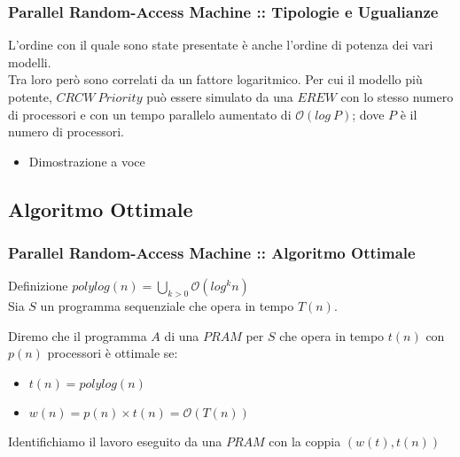 \documentclass{beamer}
\newcommand{\bigO}{\ensuremath{\mathcal{O}}} %
\begin{document}
\begin{frame}
	\frametitle{Parallel Random-Access Machine :: Tipologie e Ugualianze} %
	L'ordine con il quale sono state presentate è anche l'ordine di potenza dei vari modelli.\\
	Tra loro però sono correlati da un fattore logaritmico. Per cui il modello più potente, $CRCW\ Priority$ può essere simulato da una $EREW$ con lo stesso numero di processori e con un tempo parallelo aumentato di $\bigO{(log\ P)}$; dove $P$ è il numero di processori.
	\begin{itemize}
		\item Dimostrazione a voce
	\end{itemize}
\end{frame}

\subsection{Algoritmo Ottimale}

\begin{frame}
	\frametitle{Parallel Random-Access Machine :: Algoritmo Ottimale} %
	
	\begin{block}{Definizione}
	$polylog(n) = \bigcup_{k>0}\bigO{(log^k n)}$\\
	Sia $S$ un programma sequenziale che opera in tempo $T(n)$.\\
	\end{block}
	Diremo che il programma $A$ di una $PRAM$ per $S$ che opera in tempo $t(n)$ con $p(n)$ processori è ottimale se:
	\begin{itemize}
		\item $t(n) = polylog(n)$
		\item $w(n) = p(n)\times t(n) = \bigO{(T(n))}$
	\end{itemize}
	Identifichiamo il lavoro eseguito da una $PRAM$ con la coppia $(w(t),t(n))$
\end{frame}
\end{document}
